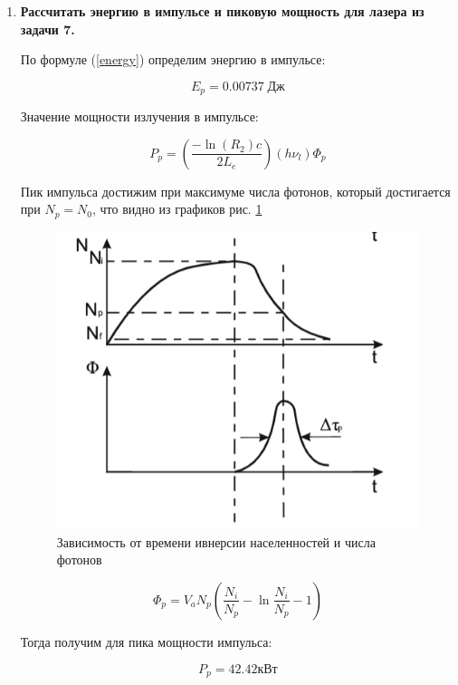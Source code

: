\documentclass[a4paper]{article}
\begin{document}
\begin{enumerate}
	\item \textbf{Рассчитать энергию в импульсе и пиковую мощность для лазера из задачи 7.} \par

	По формуле (\ref{energy}) определим энергию в импульсе:

	$$E_p = 0.00737\; Дж$$

	
	Значение мощности излучения в импульсе:

	\begin{equation}
		P_p = \left ( \frac{-\ln{(R_2)} c}{2 L_e} \right) (h \nu_l) \varPhi_p
	\end{equation}
	
	Пик импульса достижим при максимуме числа фотонов, который достигается при $N_p = N_0$, что видно из графиков рис. \ref{modulation}

	\begin{figure}[H]
		\begin{center}
			\includegraphics[scale = 0.7]{modulation.png}
			\caption{Зависимость от времени ивнерсии населенностей и числа фотонов}
			\label{modulation}
		\end{center}
	\end{figure}

	\begin{equation}
		\varPhi_p = V_a N_p \left ( \frac{N_i}{N_p} - \ln{\frac{N_i}{N_p}} - 1 \right)
	\end{equation}

	Тогда получим для пика мощности импульса:

	$$P_p = 42.42 кВт$$

\end{enumerate}
\end{document}
